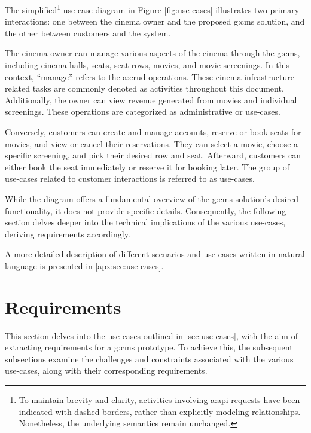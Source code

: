 The simplified\footnote{To maintain brevity and clarity, activities involving \gls{a:api} requests have been indicated with dashed borders, rather than explicitly modeling  relationships. Nonetheless, the underlying semantics remain unchanged.} use-case diagram in Figure \ref{fig:use-cases} illustrates two primary interactions: one between the cinema owner and the proposed \gls{g:cms} solution, and the other between customers and the system.

The cinema owner can manage various aspects of the cinema through the \gls{g:cms}, including cinema halls, seats, seat rows, movies, and movie screenings. In this context, \enquote{manage} refers to the \gls{a:crud} operations. These cinema-infrastructure-related tasks are commonly denoted as  activities throughout this document. Additionally, the owner can view revenue generated from movies and individual screenings. These operations are categorized as administrative or  use-cases.

Conversely, customers can create and manage accounts, reserve or book seats for movies, and view or cancel their reservations. They can select a movie, choose a specific screening, and pick their desired row and seat. Afterward, customers can either book the seat immediately or reserve it for booking later. The group of use-cases related to customer interactions is referred to as  use-cases.

While the diagram offers a fundamental overview of the \gls{g:cms} solution's desired functionality, it does not provide specific details. Consequently, the following section delves deeper into the technical implications of the various use-cases, deriving requirements accordingly.

A more detailed description of different scenarios and use-cases written in natural language is presented in \cref{apx:sec:use-cases}.

\section{Requirements}
\label{sec:requirements}

This section delves into the use-cases outlined in \cref{sec:use-cases}, with the aim of extracting requirements for a \gls{g:cms} prototype. To achieve this, the subsequent subsections examine the challenges and constraints associated with the various use-cases, along with their corresponding requirements.

